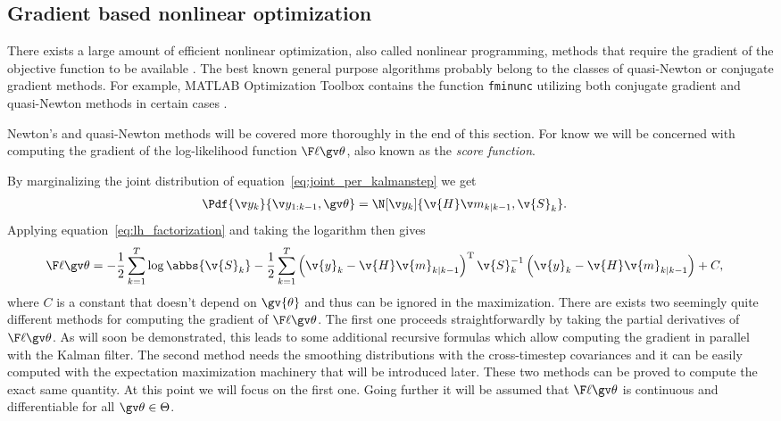 \subsection{Gradient based nonlinear optimization}\label{sec:grad}%

There exists a large amount of efficient nonlinear optimization,
also called nonlinear programming, methods that require the gradient of the 
objective function to be available \parencite{luenberger2008}.
The best known general purpose algorithms probably belong to the 
classes of quasi-Newton or conjugate gradient methods. 
For example, MATLAB Optimization Toolbox contains the function
\texttt{fminunc} utilizing both conjugate gradient and 
quasi-Newton methods in certain cases \parencite{optimizationtoolbox2012}.

Newton's and quasi-Newton
methods will be covered more thoroughly in the end of this section.  
For know we will be concerned with computing the gradient of the
log-likelihood function $\lLH$, also known as the \emph{score function}.

By marginalizing the joint distribution of equation~\eqref{eq:joint_per_kalmanstep}
we get 
\begin{align}
	\Pdf{\y_k}{\y_{1:k-1},\Th}&=\N[\yk]{\v{H}\m_{k|k-1},\v{S}_k }.
\end{align}
Applying equation~\eqref{eq:lh_factorization} and taking the logarithm then gives
\begin{align}
	\lLH&=-\frac{1}{2}\sum_{k=1}^T\log\abbs{\v{S}_k}
	-\frac{1}{2}\sum_{k=1}^T\left(\v{y}_k-\v{H}\v{m}_{k|k-1}\right)^\tr\v{S}_{k}^{-1}\left(\v{y}_k-\v{H}\v{m}_{k|k-1}\right)+C,
	\label{eq:logLH}
\end{align}
where $C$ is a constant that doesn't depend on $\gv{\theta}$ and thus can
be ignored in the maximization.
There are exists two seemingly quite different methods for computing
the gradient of $\lLH$. The first one proceeds straightforwardly by taking the
partial derivatives of $\lLH$. As will soon be demonstrated, this leads
to some additional recursive formulas which allow computing
the gradient in parallel with the Kalman filter. The second method needs
the smoothing distributions with the cross-timestep covariances
and it can be easily computed with the expectation maximization machinery
that will be introduced later. These two methods can be proved to compute
the exact same quantity. At this point we will focus on the first one. Going further
it will be assumed that $\lLH$ is continuous and differentiable for all $\Th\in\Theta$.

